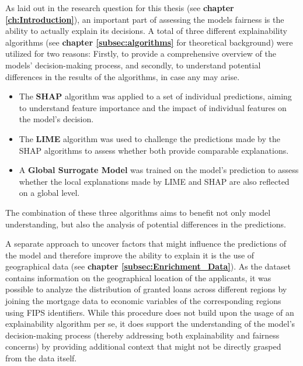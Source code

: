 As laid out in the research question for this thesis (see \textbf{chapter \ref{ch:Introduction}}), an important part of assessing the models fairness is the ability to actually explain its decisions.
A total of three different explainability algorithms (see \textbf{chapter \ref{subsec:algorithms}} for theoretical background) were utilized for two reasons: Firstly, to provide a comprehensive overview of the models' decision-making process, and secondly, to understand potential differences in the results of the algorithms, in case any may arise.
\begin{itemize}
    \item The \textbf{SHAP} algorithm was applied to a set of individual predictions, aiming to understand feature importance and the impact of individual features on the model's decision.
    \item The \textbf{LIME} algorithm was used to challenge the predictions made by the SHAP algorithms to assess whether both provide comparable explanations.
    \item A \textbf{Global Surrogate Model} was trained on the model's prediction to assess whether the local explanations made by LIME and SHAP are also reflected on a global level.
\end{itemize}
The combination of these three algorithms aims to benefit not only model understanding, but also the analysis of potential differences in the predictions.

A separate approach to uncover factors that might influence the predictions of the model and therefore improve the ability to explain it is the use of geographical data (see \textbf{chapter \ref{subsec:Enrichment_Data}}). As the dataset contains information on the geographical location of the applicants, it was possible to analyze the distribution of granted loans across different regions by joining the mortgage data to economic variables of the corresponding regions using FIPS identifiers. 
While this procedure does not build upon the usage of an explainability algorithm per se, it does support the understanding of the model's decision-making process (thereby addressing both explainability and fairness concerns) by providing additional context that might not be directly grasped from the data itself.

